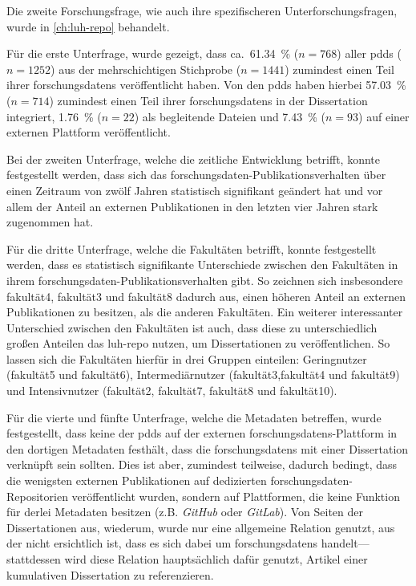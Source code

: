 Die zweite Forschungsfrage, wie auch ihre spezifischeren Unterforschungsfragen, wurde in \cref{ch:luh-repo} behandelt.

Für die erste Unterfrage, wurde gezeigt, dass ca.~\SI{61,34}{\percent} ($n=\num{768}$) aller \glspl{pdd} ($n=\num{1252}$) aus der mehrschichtigen Stichprobe ($n=\num{1441}$) zumindest einen Teil ihrer \glspl{forschungsdaten} veröffentlicht haben.
Von den \glspl{pdd} haben hierbei \SI{57,03}{\percent} ($n=\num{714}$) zumindest einen Teil ihrer \glspl{forschungsdaten} in der Dissertation integriert, \SI{1,76}{\percent} ($n=\num{22}$) als begleitende Dateien und \SI{7,43}{\percent} ($n=\num{93}$) auf einer externen Plattform veröffentlicht.

Bei der zweiten Unterfrage, welche die zeitliche Entwicklung betrifft, konnte festgestellt werden, dass sich das \gls{forschungsdaten}-Publikationsverhalten über einen Zeitraum von zwölf Jahren statistisch signifikant geändert hat und vor allem der Anteil an externen Publikationen in den letzten vier Jahren stark zugenommen hat.

Für die dritte Unterfrage, welche die Fakultäten betrifft, konnte festgestellt werden, dass es statistisch signifikante Unterschiede zwischen den Fakultäten in ihrem \gls{forschungsdaten}-Publikationsverhalten gibt.
So zeichnen sich insbesondere \gls{fakultät4}, \gls{fakultät3} und \gls{fakultät8} dadurch aus, einen höheren Anteil an externen Publikationen zu besitzen, als die anderen Fakultäten.
Ein weiterer interessanter Unterschied zwischen den Fakultäten ist auch, dass diese zu unterschiedlich großen Anteilen das \gls{luh-repo} nutzen, um Dissertationen zu veröffentlichen.
So lassen sich die Fakultäten hierfür in drei Gruppen einteilen:
Geringnutzer (\gls{fakultät5} und \gls{fakultät6}), Intermediärnutzer (\gls{fakultät3},\gls{fakultät4} und \gls{fakultät9}) und Intensivnutzer (\gls{fakultät2}, \gls{fakultät7}, \gls{fakultät8} und \gls{fakultät10}).
\pagebreak

Für die vierte und fünfte Unterfrage, welche die Metadaten betreffen, wurde festgestellt, dass keine der \glspl{pdd} auf der externen \glspl{forschungsdaten}-Plattform in den dortigen Metadaten festhält, dass die \glspl{forschungsdaten} mit einer Dissertation verknüpft sein sollten.
Dies ist aber, zumindest teilweise, dadurch bedingt, dass die wenigsten externen Publikationen auf dedizierten \gls{forschungsdaten}-Repositorien veröffentlicht wurden, sondern auf Plattformen, die keine Funktion für derlei Metadaten besitzen (z.B. \textit{GitHub} oder \textit{GitLab}).
Von Seiten der Dissertationen aus, wiederum, wurde nur eine allgemeine Relation genutzt, aus der nicht ersichtlich ist, dass es sich dabei um \glspl{forschungsdaten} handelt---stattdessen wird diese Relation hauptsächlich dafür genutzt, Artikel einer kumulativen Dissertation zu referenzieren.

